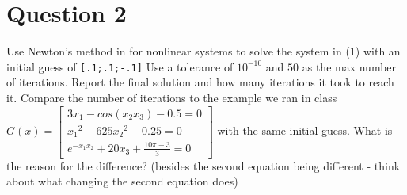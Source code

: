 \section{Question 2}

\begin{question}
    Use Newton’s method in \MATLAB for nonlinear systems to solve the system in (1) with an initial guess of \verb+[.1;.1;-.1]+ Use a tolerance of $10^{−10}$ and $50$ as the max number of iterations. Report the final solution and how many iterations it took to reach it. Compare the number of iterations to the example we ran in class $G(x) = \left[\begin{smallmatrix}3x_1 − cos(x_2x_3) − 0.5 = 0\\  {x_1}^2 −  625{x_2}^2 − 0.25 = 0\\ e^{−x_1x_2} + 20x_3 + \tfrac{10\pi−3}{3}  = 0\end{smallmatrix}\right]$ with the same initial guess. What is the reason for the difference? (besides the second equation being different - think about what changing the second equation does)
\end{question}

\begin{answer}
    
\end{answer}
